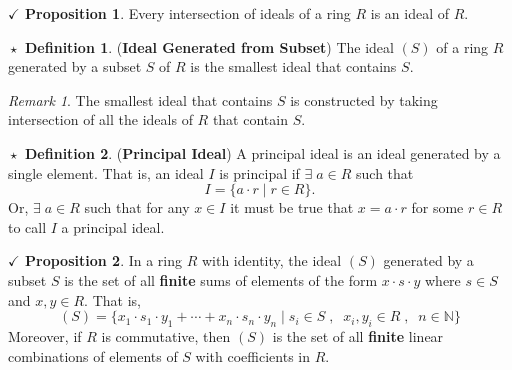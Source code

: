 \documentclass{article}
\theoremstyle{definition}
\newtheorem{definition}{$\boxed{\star}$ Definition}
\theoremstyle{remark}
\newtheorem*{remark}{Remark}
\theoremstyle{definition}
\theoremstyle{definition}
\newtheorem{proposition}{$\checkmark$ Proposition}
\theoremstyle{definition}
\theoremstyle{proof}
\begin{document}
\begin{proposition}
	Every intersection of ideals of a ring $ R $ is an ideal of $ R $.
\end{proposition}
\hrulefill
\begin{definition}
	(\textbf{Ideal Generated from Subset}) The ideal $ (S) $ of a ring $ R $ generated by a subset $ S $ of $ R $ is the smallest ideal that contains $ S $. 
\end{definition}
\begin{remark}
	The smallest ideal that contains $ S $ is constructed by taking intersection of all the ideals of $ R $ that contain $ S $.
\end{remark}
\begin{definition}
	(\textbf{Principal Ideal}) A principal ideal is an ideal generated by a single element. That is, an ideal $ I $ is principal if $ \exists \;a\in R $ such that 
	\[I = \{a\cdot r \;\vert\;r\in R\}.\]
	Or, $ \exists \;a \in R$ such that for any $ x\in I $ it must be true that $ x = a\cdot r $ for some $ r\in R $ to call $ I $ a principal ideal.
\end{definition}
\hrulefill
\begin{proposition}
	In a ring $ R $ with identity, the ideal $ (S) $ generated by a subset $ S $ is the set of all \textbf{finite} sums of elements of the form $ x\cdot s\cdot y $ where $ s\in S $ and $ x,y\in R $. That is,
	\[(S)   = \{x_1\cdot s_1\cdot y_1 + \cdots + x_n\cdot s_n\cdot y_n \;\vert\;s_i \in S\;,\;\;x_i,y_i\in R\;,\;\;n\in \mathbb{N}\}\]
	Moreover, if $ R $ is commutative, then $ (S) $ is the set of all \textbf{finite} linear combinations of elements of $ S $ with coefficients in $ R $.
\end{proposition}
\end{document}
